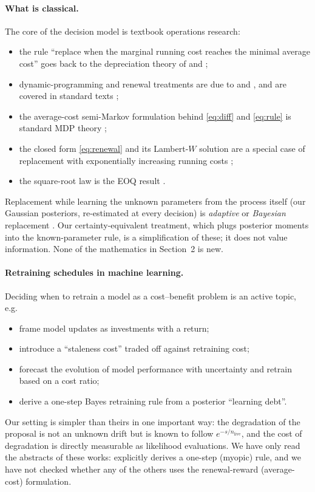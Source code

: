 \documentclass[11pt,a4paper]{article}
\newcommand{\nlive}{n_{\mathrm{live}}}
\begin{document}
\paragraph{What is classical.} The core of the decision model is textbook
operations research:
\begin{itemize}
  \item the rule ``replace when the marginal running cost reaches the minimal
        average cost'' goes back to the depreciation theory of
        \citet{Taylor1923} and \citet{Hotelling1925};
  \item dynamic-programming and renewal treatments are due to
        \citet{Bellman1955} and \citet{BarlowHunter1960}, and are covered in
        standard texts \citep{Ross1970,Tijms2003,Nakagawa2005};
  \item the average-cost semi-Markov formulation behind \eqref{eq:diff} and
        \eqref{eq:rule} is standard MDP theory \citep{Puterman1994};
  \item the closed form \eqref{eq:renewal} and its Lambert-$W$ solution are a
        special case of replacement with exponentially increasing running
        costs \citep{TiradoSerrato2025};
  \item the square-root law is the EOQ result \citep{Harris1913}.
\end{itemize}
Replacement while learning the unknown parameters from the process itself
(our Gaussian posteriors, re-estimated at every decision) is \emph{adaptive}
or \emph{Bayesian} replacement \citep{Fox1967,DayanikGurler2002}. Our
certainty-equivalent treatment, which plugs posterior moments into the
known-parameter rule, is a simplification of these; it does not value
information. None of the mathematics in Section~2 is new.

\paragraph{Retraining schedules in machine learning.} Deciding when to
retrain a model as a cost--benefit problem is an active topic, e.g.
\begin{itemize}
  \item \citet{Zliobaite2015} frame model updates as investments with a
        return;
  \item \citet{Mahadevan2024} introduce a ``staleness cost'' traded off
        against retraining cost;
  \item \citet{Regol2025} forecast the evolution of model performance with
        uncertainty and retrain based on a cost ratio;
  \item \citet{Katz2026} derive a one-step Bayes retraining rule from a
        posterior ``learning debt''.
\end{itemize}
Our setting is simpler than theirs in one important way: the degradation of
the proposal is not an unknown drift but is known to follow
$e^{-s/\nlive}$, and the cost of degradation is directly measurable as
likelihood evaluations. We have only read the abstracts of these works:
\citet{Katz2026} explicitly derives a one-step (myopic) rule, and we have not
checked whether any of the others uses the renewal-reward (average-cost)
formulation.
\end{document}
